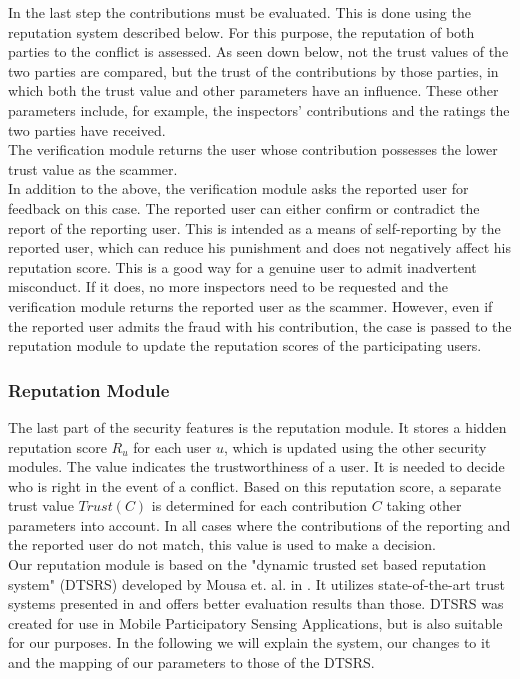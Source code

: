 \documentclass[
a4paper,     %
titlepage,   %
14pt         %
]{scrartcl}  %
\theoremstyle{mystyle}
\begin{document}
In the last step the contributions must be evaluated. This is done using the reputation system described below. For this purpose, the reputation of both parties to the conflict is assessed. As seen down below, not the trust values of the two parties are compared, but the trust of the contributions by those parties, in which both the trust value and other parameters have an influence. These other parameters include, for example, the inspectors' contributions and the ratings the two parties have received. \\

The verification module returns the user whose contribution possesses the lower trust value as the scammer. \\

In addition to the above, the verification module asks the reported user for feedback on this case. The reported user can either confirm or contradict the report of the reporting user. This is intended as a means of self-reporting by the reported user, which can reduce his punishment and does not negatively affect his reputation score. This is a good way for a genuine user to admit inadvertent misconduct. If it does, no more inspectors need to be requested and the verification module returns the reported user as the scammer. However, even if the reported user admits the fraud with his contribution, the case is passed to the reputation module to update the reputation scores of the participating users.

\subsubsection{Reputation Module} The last part of the security features is the reputation module. It stores a hidden reputation score $R_u$ for each user $u$, which is updated using the other security modules. The value indicates the trustworthiness of a user. It is needed to decide who is right in the event of a conflict. Based on this reputation score, a separate trust value $Trust(C)$ is determined for each contribution $C$ taking other parameters into account. In all cases where the contributions of the reporting and the reported user do not match, this value is used to make a decision. \\

Our reputation module is based on the "dynamic trusted set based reputation system" (DTSRS) developed by Mousa et. al. in \cite{mousa2017reputation}. It utilizes state-of-the-art trust systems presented in \cite{mousa2015trust} and offers better evaluation results than those. DTSRS was created for use in Mobile Participatory Sensing Applications, but is also suitable for our purposes. In the following we will explain the system, our changes to it and the mapping of our parameters to those of the DTSRS. \\
\end{document}
